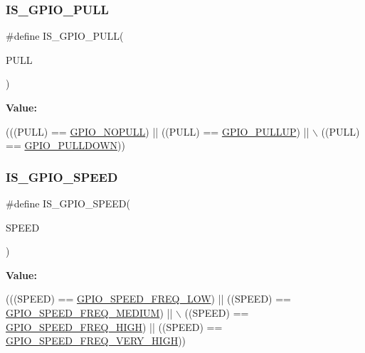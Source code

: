 \subsubsection{\texorpdfstring{I\+S\+\_\+\+G\+P\+I\+O\+\_\+\+P\+U\+LL}{IS\_GPIO\_PULL}}
{\footnotesize\ttfamily \#define I\+S\+\_\+\+G\+P\+I\+O\+\_\+\+P\+U\+LL(\begin{DoxyParamCaption}\item[{}]{P\+U\+LL }\end{DoxyParamCaption})}

{\bfseries Value\+:}
\begin{DoxyCode}
(((PULL) == \mbox{\hyperlink{group___g_p_i_o__pull__define_ga5c2862579882c1cc64e36d38fbd07a4c}{GPIO\_NOPULL}}) || ((PULL) == \mbox{\hyperlink{group___g_p_i_o__pull__define_gae689bc8f5c42d6df7bd54a8dd372e072}{GPIO\_PULLUP}}) || \(\backslash\)
                            ((PULL) == \mbox{\hyperlink{group___g_p_i_o__pull__define_ga75d958d0410c36da7f27d1f4f5c36c14}{GPIO\_PULLDOWN}}))
\end{DoxyCode}
\mbox{\label{group___g_p_i_o___private___macros_ga888e1f951df2fe9dbf827528051a3a56}} 
\subsubsection{\texorpdfstring{I\+S\+\_\+\+G\+P\+I\+O\+\_\+\+S\+P\+E\+ED}{IS\_GPIO\_SPEED}}
{\footnotesize\ttfamily \#define I\+S\+\_\+\+G\+P\+I\+O\+\_\+\+S\+P\+E\+ED(\begin{DoxyParamCaption}\item[{}]{S\+P\+E\+ED }\end{DoxyParamCaption})}

{\bfseries Value\+:}
\begin{DoxyCode}
(((SPEED) == \mbox{\hyperlink{group___g_p_i_o__speed__define_gab7916c4265bfa1b26a5205ea9c1caa4e}{GPIO\_SPEED\_FREQ\_LOW}})  || ((SPEED) == 
      \mbox{\hyperlink{group___g_p_i_o__speed__define_ga1724a25a9cf00ebf485daeb09cfa1e25}{GPIO\_SPEED\_FREQ\_MEDIUM}}) || \(\backslash\)
                              ((SPEED) == \mbox{\hyperlink{group___g_p_i_o__speed__define_gaef5898db71cdb957cd41f940b0087af8}{GPIO\_SPEED\_FREQ\_HIGH}}) || ((SPEED) == 
      \mbox{\hyperlink{group___g_p_i_o__speed__define_ga1944cf10e2ab172810d38b681d40b771}{GPIO\_SPEED\_FREQ\_VERY\_HIGH}}))
\end{DoxyCode}
